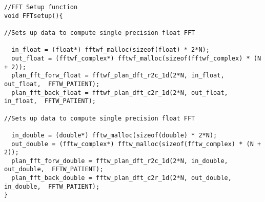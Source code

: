 \lstset{framesep=-10pt, xleftmargin=-10pt}
\begin{lstlisting}[caption={FHEW: FFT Setup Function},label={listing:3.8.3}]
//FFT Setup function
void FFTsetup(){

//Sets up data to compute single precision float FFT

  in_float = (float*) fftwf_malloc(sizeof(float) * 2*N);
  out_float = (fftwf_complex*) fftwf_malloc(sizeof(fftwf_complex) * (N + 2));
  plan_fft_forw_float = fftwf_plan_dft_r2c_1d(2*N, in_float, out_float,  FFTW_PATIENT);
  plan_fft_back_float = fftwf_plan_dft_c2r_1d(2*N, out_float, in_float,  FFTW_PATIENT);

//Sets up data to compute single precision float FFT

  in_double = (double*) fftw_malloc(sizeof(double) * 2*N);
  out_double = (fftw_complex*) fftw_malloc(sizeof(fftw_complex) * (N + 2));
  plan_fft_forw_double = fftw_plan_dft_r2c_1d(2*N, in_double, out_double,  FFTW_PATIENT);
  plan_fft_back_double = fftw_plan_dft_c2r_1d(2*N, out_double, in_double,  FFTW_PATIENT);
}

\end{lstlisting}



